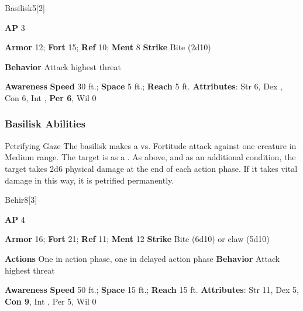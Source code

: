 \begin{monsection}{Basilisk}{5}[2]
\vspace{-1em}\vspace{-1em}
\begin{spellcontent}
\begin{spelltargetinginfo}
{\textbf{AP} 3}

\pari \textbf{Armor} 12;
\textbf{Fort} 15;
\textbf{Ref} 10;
\textbf{Ment} 8
\pari \textbf{Strike} Bite  (2d10)



\pari \textbf{Behavior} Attack highest threat
\end{spelltargetinginfo}
\end{spellcontent}

\begin{monsterfooter}
\pari \textbf{Awareness} 
\pari \textbf{Speed} 30 ft.;
\textbf{Space} 5 ft.;
\textbf{Reach} 5 ft.
\pari \textbf{Attributes}:
Str 6,
Dex ,
Con 6,
Int ,
\textbf{Per 6},
Wil 0
\end{monsterfooter}
\end{monsection}


\subsubsection{Basilisk Abilities}

\begin{ability}{Petrifying Gaze}
The basilisk makes a  vs. Fortitude attack against one creature in Medium range.
\hit The target is  as a .
\crit As above, and as an additional condition, the target takes 2d6 physical damage at the end of each action phase.
If it takes vital damage in this way, it is petrified permanently.
\end{ability}

\begin{monsection}{Behir}{8}[3]
\vspace{-1em}\vspace{-1em}
\begin{spellcontent}
\begin{spelltargetinginfo}
{\textbf{AP} 4}

\pari \textbf{Armor} 16;
\textbf{Fort} 21;
\textbf{Ref} 11;
\textbf{Ment} 12
\pari \textbf{Strike} Bite  (6d10) or claw  (5d10)


\pari \textbf{Actions} One in action phase, one in delayed action phase
\pari \textbf{Behavior} Attack highest threat
\end{spelltargetinginfo}
\end{spellcontent}

\begin{monsterfooter}
\pari \textbf{Awareness} 
\pari \textbf{Speed} 50 ft.;
\textbf{Space} 15 ft.;
\textbf{Reach} 15 ft.
\pari \textbf{Attributes}:
Str 11,
Dex 5,
\textbf{Con 9},
Int ,
Per 5,
Wil 0
\end{monsterfooter}
\end{monsection}


